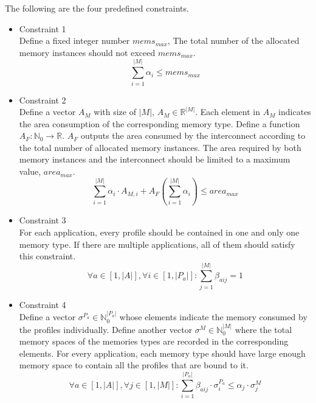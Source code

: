 	The following are the four predefined constraints.
	
	\begin{itemize}
		\item Constraint 1 \\
			Define a fixed integer number $mems_{max}$, 
			The total number of the allocated memory instances
			should not exceed $mems_{max}$.
			\begin{equation}
			\label{equa:constraint_1}
				\sum_{i=1}^{\lvert M \rvert} \alpha_{i}
				\leq mems_{max}
			\end{equation}
		\item Constraint 2 \\
			Define a vector $A_{M}$ with size of $\lvert M \lvert$,
			$A_{M} \in \mathbb{R}^{\lvert M \lvert}$. Each element in
			$A_{M}$ indicates the area consumption of the corresponding
			memory type.
			Define a function $A_{F} \colon \mathbb{N}_{0}
			\rightarrow \mathbb{R}$. $A_{F}$ outputs the area consumed
			by the interconnect according to the total number of allocated
			memory instances.
			The area required by both memory instances and the interconnect
			should be limited to a maximum value, $area_{max}$.
			\begin{equation}
			\label{equa:constraint_2}
				\sum_{i=1}^{\lvert M \rvert} \alpha_{i} \cdot A_{M,i}
				+ A_{F} ( \sum_{i=1}^{\lvert M \rvert} \alpha_{i} ) 
				\leq area_{max}
			\end{equation}			
		\item Constraint 3 \\
			For each application, every profile should be contained in one
			and only one memory type. If there are multiple applications, all
			of them should satisfy this constraint.
			\begin{equation}
			\label{equa:constraint_3}
				\forall a \in \left[ 1, \lvert A \rvert \right], 
				\forall i \in \left[ 1, \lvert P_a \rvert \right] \colon
				\sum_{j=1}^{\lvert M \rvert} \beta_{aij} = 1
			\end{equation}		
		\item Constraint 4 \\
			Define a vector
			$\sigma^{P_{a}} \in \mathbb{N}_{0}^{\lvert P_{a} \rvert} $
			whose elements indicate the memory consumed by the profiles
			individually.
			Define another vector
			$\sigma^{M} \in \mathbb{N}_{0}^{\lvert M \rvert}$
			where the total memory spaces of the memories types are
			recorded in the corresponding elements.
			For every application, each memory type should have large enough 
			memory space to contain all the profiles that are bound to it.
			\begin{equation}
			\label{equa:constraint_4}
				\forall a \in \left[ 1, \lvert A \rvert \right], 
				\forall j \in \left[ 1, \lvert M \rvert \right] \colon
				\sum_{i=1}^{\lvert P_{a} \rvert} \beta_{aij} \cdot
				\sigma_{i}^{P_{a}} \leq \alpha_{j} \cdot \sigma_{j}^{M}
			\end{equation}			
			
	\end{itemize}
	
